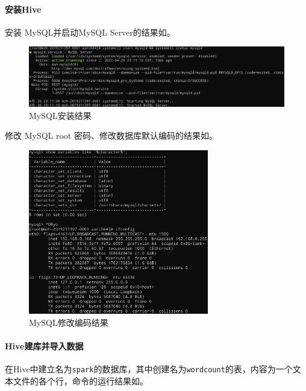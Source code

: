 \documentclass[lang=cn,11pt,a4paper,cite=authornum]{paper}
\begin{document}
\paragraph{安装Hive}

安装 MySQL并启动MySQL Server的结果如。

\begin{figure}[!htb]
    \centering
    \includegraphics[width=\textwidth]{./images/mysql1.jpg}
    \caption{MySQL安装结果\label{fig:mysql1}}
\end{figure}

修改 MySQL root 密码、修改数据库默认编码的结果如。

\begin{figure}[!htb]
    \centering
    \includegraphics[width=0.7\textwidth]{./images/mysql2.jpg}
    \caption{MySQL修改编码结果\label{fig:mysql2}}
\end{figure}

\paragraph{Hive建库并导入数据}

在Hive中建立名为\texttt{spark}的数据库，其中创建名为\texttt{wordcount}的表，内容为一个文本文件的各个行，命令的运行结果如。
\end{document}
